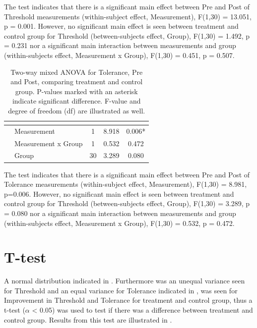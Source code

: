 The test indicates that there is a significant main effect between Pre and Post of Threshold measurements (within-subject effect, Measurement), F(1,30) = 13.051, p = 0.001. However, no significant main effect is seen between treatment and control group for Threshold (between-subjects effect, Group), F(1,30) = 1.492, p = 0.231 nor a significant main interaction between measurements and group (within-subjects effect, Measurement x Group), F(1,30) = 0.451, p = 0.507. 
 
\begin{longtable} {l|l|c|c|c}
\caption{Two-way mixed ANOVA for Tolerance, Pre and Post, comparing treatment and control group. P-values marked with an asterisk indicate significant difference. F-value and degree of freedom (df) are illustrated as well.}
	\label{tab:ANOVA2} \\
  \cellcolor[HTML]{C0C0C0}{} &  \cellcolor[HTML]{C0C0C0}{} & \multicolumn{1}{c|}{ \cellcolor[HTML]{C0C0C0}{\textbf{df}}} &
 \multicolumn{1}{c|}{ \cellcolor[HTML]{C0C0C0}{\textbf{F}}} & \multicolumn{1}{c}{ \cellcolor[HTML]{C0C0C0}{\textbf{Sig}}} \\ \hline  
\cellcolor[HTML]{C0C0C0} & Measurement & 1 & 8.918 & 0.006*  \\ \cline{2-5}
\cellcolor[HTML]{C0C0C0}\multirow{-2}{*}{\textbf{Within-Subjects effect}} & Measurement x Group & 1 & 0.532 & 0.472  \\ \hline
\cellcolor[HTML]{C0C0C0}{\textbf{Between-Subjects effect}} & Group & 30 & 3.289 & 0.080  \\ \hline
\end{longtable}
\vspace{-.5cm}

The test indicates that there is a significant main effect between Pre and Post of Tolerance measurements (within-subject effect, Measurement), F(1,30) = 8.981, p=0.006. However, no significant main effect is seen between treatment and control group for Threshold (between-subjects effect, Group), F(1,30) = 3.289, p = 0.080 nor a significant main interaction between  measurements and group (within-subjects effect, Measurement x Group), F(1,30) = 0.532, p = 0.472. 

\section{T-test}
A normal distribution indicated in . Furthermore was an unequal variance seen for Threshold and an equal variance for Tolerance indicated in , was seen for Improvement in Threshold and Tolerance for treatment and control group, thus a t-test ($\alpha$ < 0.05) was used to test if there was a difference between treatment and control group. Results from this test are illustrated in .

